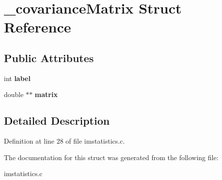 \hypertarget{struct__covariance_matrix}{
\section{\_\-covarianceMatrix Struct Reference}
\label{struct__covariance_matrix}
}
\subsection*{Public Attributes}
\begin{DoxyCompactItemize}
\item 
\hypertarget{struct__covariance_matrix_af5fb529b5e017dd494deec103ce6adce}{
int {\bfseries label}}
\label{struct__covariance_matrix_af5fb529b5e017dd494deec103ce6adce}

\item 
\hypertarget{struct__covariance_matrix_a9f6825c76fead255d8d8a13bd79f2842}{
double $\ast$$\ast$ {\bfseries matrix}}
\label{struct__covariance_matrix_a9f6825c76fead255d8d8a13bd79f2842}

\end{DoxyCompactItemize}


\subsection{Detailed Description}


Definition at line 28 of file imstatistics.c.



The documentation for this struct was generated from the following file:\begin{DoxyCompactItemize}
\item 
imstatistics.c\end{DoxyCompactItemize}
